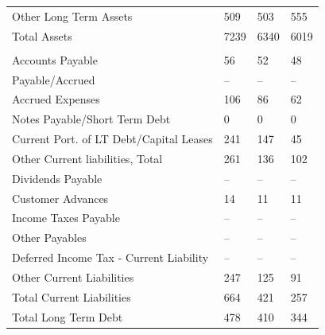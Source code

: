 \documentclass[grad,numbers]{coppe}
\begin{document}
\begin{longtable}[t]{llll}
  \hspace{1em}\hspace{1em}Other Long Term Assets & 509 & 503 & 555\\
  \hspace{1em}Total Assets & 7239 & 6340 & 6019\\
  \addlinespace[0.3em]
  \multicolumn{4}{l}{\textbf{Liabilities}}\\
  \hspace{1em}Accounts Payable & 56 & 52 & 48\\
  \hspace{1em}Payable/Accrued & -- & -- & --\\
  \hspace{1em}Accrued Expenses & 106 & 86 & 62\\
  \hspace{1em}Notes Payable/Short Term Debt & 0 & 0 & 0\\
  \hspace{1em}Current Port. of LT Debt/Capital Leases & 241 & 147 & 45\\
  \hspace{1em}Other Current liabilities, Total & 261 & 136 & 102\\
  \hspace{1em}\hspace{1em}Dividends Payable & -- & -- & --\\
  \hspace{1em}\hspace{1em}Customer Advances & 14 & 11 & 11\\
  \hspace{1em}\hspace{1em}Income Taxes Payable & -- & -- & --\\
  \hspace{1em}\hspace{1em}Other Payables & -- & -- & --\\
  \hspace{1em}\hspace{1em}Deferred Income Tax - Current Liability & -- & -- & --\\
  \hspace{1em}\hspace{1em}Other Current Liabilities & 247 & 125 & 91\\
  \hspace{1em}Total Current Liabilities & 664 & 421 & 257\\
  Total \hspace{1em}\hspace{1em}Long Term Debt & 478 & 410 & 344\\

\end{longtable}
\end{document}
